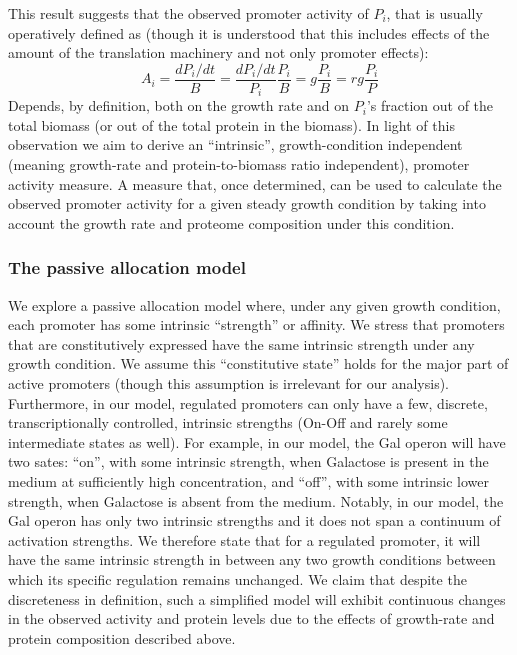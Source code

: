 \documentclass[a4page,notitlepage]{article}
\begin{document}
This result suggests that the observed promoter activity of $P_i$, that is usually operatively defined as (though it is understood that this includes effects of the amount of the translation machinery and not only promoter effects):
\begin{equation}
\label{pa-gr-relation}
A_i=\frac{dP_i/dt}{B}=\frac{dP_i/dt}{P_i}\frac{P_i}{B}=g\frac{P_i}{B}=rg\frac{P_i}{P}
\end{equation}
Depends, by definition, both on the growth rate and on $P_i$’s fraction out of the total biomass (or out of the total protein in the biomass).
In light of this observation we aim to derive an “intrinsic”, growth-condition independent (meaning growth-rate and protein-to-biomass ratio independent), promoter activity measure.
A measure that, once determined, can be used to calculate the observed promoter activity for a given steady growth condition by taking into account the growth rate and proteome composition under this condition.
\subsubsection{The passive allocation model}
We explore a passive allocation model where, under any given growth condition, each promoter has some intrinsic ``strength'' or affinity.
We stress that promoters that are constitutively expressed have the same intrinsic strength under any growth condition.
We assume this ``constitutive state'' holds for the major part of active promoters (though this assumption is irrelevant for our analysis).
Furthermore, in our model, regulated promoters can only have a few, discrete, transcriptionally controlled, intrinsic strengths (On-Off and rarely some intermediate states as well).
For example, in our model, the Gal operon will have two sates: ``on'', with some intrinsic strength, when Galactose is present in the medium at sufficiently high concentration, and ``off'', with some intrinsic lower strength, when Galactose is absent from the medium.
Notably, in our model, the Gal operon has only two intrinsic strengths and it does not span a continuum of activation strengths.
We therefore state that for a regulated promoter, it will have the same intrinsic strength in between any two growth conditions between which its specific regulation remains unchanged.
We claim that despite the discreteness in definition, such a simplified model will exhibit continuous changes in the observed activity and protein levels due to the effects of growth-rate and protein composition described above.
\end{document}
